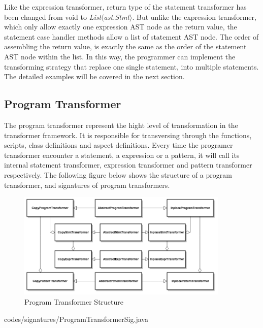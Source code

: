 \documentclass{comp621}
\begin{document}
Like the expression transformer, return type of the statement transformer has
been changed from void to \emph{List$\langle$ast.Stmt$\rangle$}. But unlike
the expression transformer, which only allow exactly one expression AST node as
the return value, the statement case handler methods allow a list of statement
AST node. The order of assembling the return value, is exactly the same as the
order of the statement AST node within the list. In this way, the programmer
can implement the transforming strategy that replace one single statement, into
multiple statements. The detailed examples will be covered in the next
section.

\subsection{Program Transformer}

The program transformer represent the hight level of transformation in the
transformer framework. It is responsible for transversing through the
functions, scripts, class definitions and aspect definitions. Every time the
programer transformer encounter a statement, a expression or a
pattern, it will call its internal statement transformer, expression
transformer and pattern transformer respectively. The following figure below
shows the structure of a program transformer, and signatures of program
transformers.

\begin{figure}[!htbp]
    \begin{center}
    \includegraphics[width=0.9\textwidth]
                    {figures/program_transfomer_structure}
    \end{center}
    \caption{Program Transformer Structure}
\end{figure}


                {codes/signatures/ProgramTransformerSig.java}
\end{document}
